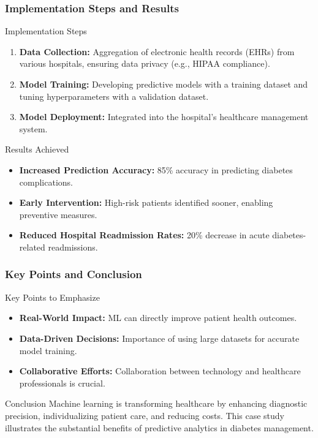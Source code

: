 \documentclass[aspectratio=169]{beamer}
\begin{document}
\begin{frame}[fragile]
    \frametitle{Implementation Steps and Results}
    \begin{block}{Implementation Steps}
        \begin{enumerate}
            \item \textbf{Data Collection:} Aggregation of electronic health records (EHRs) from various hospitals, ensuring data privacy (e.g., HIPAA compliance).
            \item \textbf{Model Training:} Developing predictive models with a training dataset and tuning hyperparameters with a validation dataset.
            \item \textbf{Model Deployment:} Integrated into the hospital’s healthcare management system.
        \end{enumerate}
    \end{block}

    \begin{block}{Results Achieved}
        \begin{itemize}
            \item \textbf{Increased Prediction Accuracy:} 85\% accuracy in predicting diabetes complications.
            \item \textbf{Early Intervention:} High-risk patients identified sooner, enabling preventive measures.
            \item \textbf{Reduced Hospital Readmission Rates:} 20\% decrease in acute diabetes-related readmissions.
        \end{itemize}
    \end{block}
\end{frame}

\begin{frame}[fragile]
    \frametitle{Key Points and Conclusion}
    \begin{block}{Key Points to Emphasize}
        \begin{itemize}
            \item \textbf{Real-World Impact:} ML can directly improve patient health outcomes.
            \item \textbf{Data-Driven Decisions:} Importance of using large datasets for accurate model training.
            \item \textbf{Collaborative Efforts:} Collaboration between technology and healthcare professionals is crucial.
        \end{itemize}
    \end{block}

    \begin{block}{Conclusion}
        Machine learning is transforming healthcare by enhancing diagnostic precision, individualizing patient care, and reducing costs. This case study illustrates the substantial benefits of predictive analytics in diabetes management.
    \end{block}
\end{frame}
\end{document}
